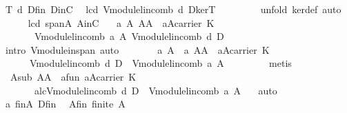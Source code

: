 \begin{isabellebody}
\ T{}\ d\ Dfin\ DinC\ \isamarkupfalse%
\ lc{\isacharunderscore}d{\isacharcolon}\ {\isachardoublequoteopen}V{\isachardot}module{\isachardot}lincomb\ d\ D{\isasymin}kerT{\isachardoublequoteclose}\ \isanewline
\ \ \ \ \ \ \isamarkupfalse%
\ {\isacharparenleft}unfold\ ker{\isacharunderscore}def{\isacharcomma}\ auto{\isacharparenright}\isanewline
\ \ \ \ \isamarkupfalse%
\ lc{\isacharunderscore}d\ spanA\ AinC\ \isamarkupfalse%
\ \ {\isachardoublequoteopen}{\isasymexists}a{\isacharprime}\ A{\isacharprime}{\isachardot}\ A{\isacharprime}{\isasymsubseteq}A\ {\isasymand}\ a{\isacharprime}{\isasymin}A{\isacharprime}{\isasymrightarrow}carrier\ K\ {\isasymand}\isanewline
\ \ \ \ \ \ \ V{\isachardot}module{\isachardot}lincomb\ a{\isacharprime}\ A{\isacharprime}{\isacharequal}\ V{\isachardot}module{\isachardot}lincomb\ d\ D{\isachardoublequoteclose}\ \isanewline
\ \ \ \ \ \ \isamarkupfalse%
\ {\isacharparenleft}intro\ V{\isachardot}module{\isachardot}in{\isacharunderscore}span{\isacharcomma}\ auto{\isacharparenright}\isanewline
\ \ \ \ \isamarkupfalse%
\ \isamarkupfalse%
\ a{\isacharprime}\ A{\isacharprime}\ \ a{\isacharprime}{\isacharcolon}\ {\isachardoublequoteopen}A{\isacharprime}{\isasymsubseteq}A\ {\isasymand}\ a{\isacharprime}{\isasymin}A{\isacharprime}{\isasymrightarrow}carrier\ K\ {\isasymand}\isanewline
\ \ \ \ \ \ V{\isachardot}module{\isachardot}lincomb\ d\ D\ {\isacharequal}\ V{\isachardot}module{\isachardot}lincomb\ a{\isacharprime}\ A{\isacharprime}{\isachardoublequoteclose}\ \isanewline
\ \ \ \ \ \ \isamarkupfalse%
\ metis\isanewline
\ \ \ \ \isamarkupfalse%
\ \ A{\isacharprime}sub{\isacharcolon}\ {\isachardoublequoteopen}A{\isacharprime}{\isasymsubseteq}A{\isachardoublequoteclose}\ \ a{\isacharprime}fun{\isacharcolon}\ {\isachardoublequoteopen}a{\isacharprime}{\isasymin}A{\isacharprime}{\isasymrightarrow}carrier\ K{\isachardoublequoteclose}\ \isanewline
\ \ \ \ \ \ \ a{\isacharprime}{\isacharunderscore}lc{\isacharcolon}{\isachardoublequoteopen}V{\isachardot}module{\isachardot}lincomb\ d\ D\ {\isacharequal}\ V{\isachardot}module{\isachardot}lincomb\ a{\isacharprime}\ A{\isacharprime}{\isachardoublequoteclose}\ \ \isamarkupfalse%
\ auto\isanewline
\ \ \ \ \isamarkupfalse%
\ a{\isacharprime}\ finA\ Dfin\ \isamarkupfalse%
\ A{\isacharprime}fin{\isacharcolon}\ {\isachardoublequoteopen}finite\ {\isacharparenleft}A{\isacharprime}{\isacharparenright}{\isachardoublequoteclose}\ \ \isamarkupfalse%

\end{isabellebody}
